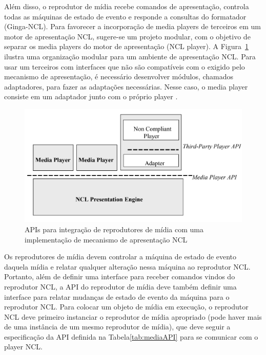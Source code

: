  Além disso, o reprodutor de mídia recebe comandos de apresentação, controla todas as máquinas de estado de evento e responde a consultas do formatador (Ginga-NCL). Para favorecer a incorporação de media players de terceiros em um motor de apresentação NCL, sugere-se um projeto modular, com o objetivo de separar os media players do motor de apresentação (NCL player). A Figura~\ref{fig:mediaPlayer} ilustra uma organização modular para um ambiente de apresentação NCL. Para usar um terceiros com interfaces que não são compatíveis com o exigido pelo mecanismo de apresentação, é necessário desenvolver módulos, chamados adaptadores, para fazer as adaptações necessárias. Nesse caso, o media player consiste em um adaptador junto com o próprio player \cite{ITU:2009ma}.

\begin{figure}[!h]
    \centering
    \includegraphics  [scale=0.4,keepaspectratio=true]{figuras/IntegracaoMediaPlayer.png}
    \caption{APIs para integração de reprodutores de mídia com uma implementação de mecanismo de apresentação NCL \cite{ITU:2009ma}}
    \label{fig:mediaPlayer}
\end{figure}

Os reprodutores de mídia devem controlar a máquina de estado de evento daquela mídia e relatar qualquer alteração nessa máquina ao reprodutor NCL. Portanto, além de definir uma interface para receber comandos vindos do reprodutor NCL, a API do reprodutor de mídia deve também definir uma interface para relatar mudanças de estado de evento da máquina para o reprodutor NCL. Para colocar um objeto de mídia em execução, o reprodutor NCL deve primeiro instanciar o reprodutor de mídia apropriado (pode haver mais de uma instância de um mesmo reprodutor de mídia), que deve seguir a especificação da API definida na Tabela\ref{tab:mediaAPI} para se comunicar com o player NCL.

